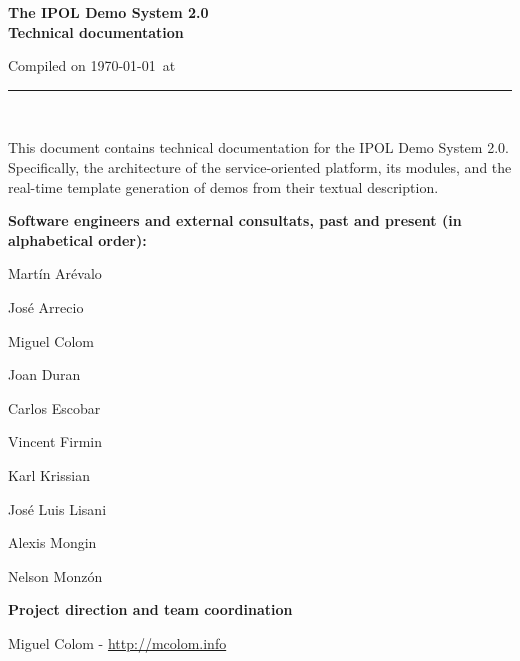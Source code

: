 \documentclass[a4paper,12pt]{article}
\begin{document}
\begin{titlepage}

\begin{center}
\vspace*{-1in}

\vspace*{0.6in}
\begin{Large}
\textbf{The IPOL Demo System 2.0 \\Technical documentation} \\
\end{Large}

\vspace*{0.6in}

\small{Compiled on \today\ at \currenttime}

\vspace*{0.6in}
\rule{80mm}{0.1mm}\\
\vspace*{0.1in}
\end{center}

\end{titlepage}

This document contains technical documentation for the IPOL Demo System 2.0. Specifically, the architecture of the service-oriented platform, its modules, and the real-time template generation of demos from their textual description.
\vspace*{0.6in}

\textbf{Software engineers and external consultats, past and present (in alphabetical order):}


Martín Arévalo

José Arrecio

Miguel Colom

Joan Duran

Carlos Escobar

Vincent Firmin

Karl Krissian

José Luis Lisani

Alexis Mongin

Nelson Monzón

\vspace*{0.2in}

\textbf{Project direction and team coordination}

Miguel Colom - \url{http://mcolom.info}



\newpage
\end{document}

